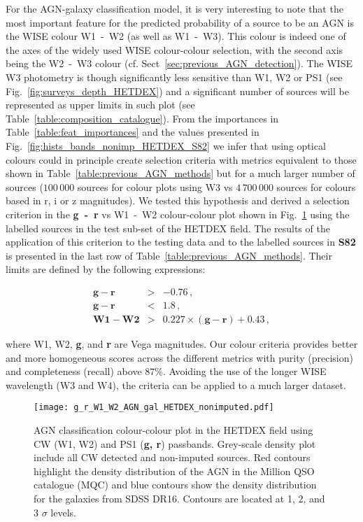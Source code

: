 \documentclass{aa}
\begin{document}
For the AGN-galaxy classification model, it is very interesting to note that the most important feature for the predicted probability of a source to be an AGN is the WISE colour W1~-~W2 (as well as W1~-~W3). This colour is indeed one of the axes of the widely used WISE colour-colour selection, with the second axis being the W2~-~W3 colour (cf. Sect~\ref{sec:previous_AGN_detection}). The WISE W3 photometry is though significantly less sensitive than W1, W2 or PS1 (see Fig.~\ref{fig:surveys_depth_HETDEX}) and a significant number of sources will be represented as upper limits in such plot (see Table~\ref{table:composition_catalogue}). From the importances in Table~\ref{table:feat_importances} and the values presented in Fig.~\ref{fig:hists_bands_nonimp_HETDEX_S82} we infer that using optical colours could in principle create selection criteria with metrics equivalent to those shown in Table~\ref{table:previous_AGN_methods} but for a much larger number of sources ($100\,000$ sources for colour plots using W3 vs $4\,700\,000$ sources for colours based in r, i or z magnitudes). We tested this hypothesis and derived a selection criterion in the \textbf{g~-~r} vs W1~-~W2 colour-colour plot shown in Fig.~\ref{fig:HETDEX_gr_W1W2_AGN_gal_class} using the labelled sources in the test sub-set of the HETDEX field. The results of the application of this criterion to the testing data and to the labelled sources in \textbf{S82} is presented in the last row of Table~\ref{table:previous_AGN_methods}. Their limits are defined by the following expressions:

\begin{eqnarray}
\mathbf{g - r} &>& \mathbf{-0.76}\,,\\
\mathbf{g - r} &<& \mathbf{1.8}\,,\\
\mathbf{W1 - W2} &>& \mathbf{0.227 \times (g - r) + 0.43}\,,
\end{eqnarray}

\noindent where W1, W2, \textbf{g}, and \textbf{r} are Vega magnitudes. Our colour criteria provides better and more homogeneous scores across the different metrics with purity (precision) and completeness (recall) above $87\%$. Avoiding the use of the longer WISE wavelength (W3 and W4), the criteria can be applied to a much larger dataset.


\begin{figure}
    \centering
    \begin{minipage}{0.80\columnwidth}
    \texttt{[image: g\_r\_W1\_W2\_AGN\_gal\_HETDEX\_nonimputed.pdf]}
    \end{minipage}%
    \caption{AGN classification colour-colour plot in the HETDEX field using CW (W1, W2) and PS1 (\textbf{g, r}) passbands. Grey-scale density plot include all CW detected and non-imputed sources. Red contours highlight the density distribution of the AGN in the Million QSO catalogue (MQC) and blue contours show the density distribution for the galaxies from SDSS DR16. Contours are located at 1, 2, and 3 $\sigma$ levels.}
   \label{fig:HETDEX_gr_W1W2_AGN_gal_class}
\end{figure}
\end{document}
